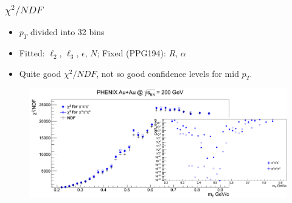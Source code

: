 \documentclass{beamer}
\begin{document}
\begin{frame}
\frametitle{$\chi^2/NDF$}
\begin{itemize}
\setlength{\itemsep}{10pt}
\item $p_T$ divided into 32 bins
\item Fitted: $\ell_2$, $\ell_3$, $\epsilon$, $N$; Fixed (PPG194): $R$, $\alpha$
\item Quite good $\chi^2/NDF$, not so good confidence levels for mid $p_T$
\end{itemize}
\begin{figure}
\includegraphics[scale=0.38]{pic/chi2confl}
\end{figure}
\end{frame}
\end{document}
